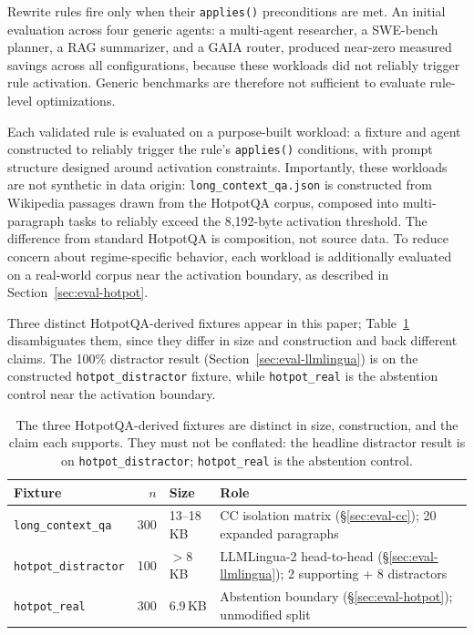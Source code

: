 \documentclass[sigconf,9pt]{acmart}
\begin{document}
Rewrite rules fire only when their \texttt{applies()} preconditions are met. An
initial evaluation across four generic agents: a multi-agent researcher, a
SWE-bench planner, a RAG summarizer, and a GAIA router, produced near-zero
measured savings across all configurations, because these workloads did not reliably
trigger rule activation. Generic benchmarks are therefore not sufficient to evaluate
rule-level optimizations.

Each validated rule is evaluated on a purpose-built workload: a fixture and agent
constructed to reliably trigger the rule's \texttt{applies()} conditions, with prompt
structure designed around activation constraints. Importantly, these workloads are not
synthetic in data origin: \texttt{long\_context\_qa.json} is constructed from
Wikipedia passages drawn from the HotpotQA corpus, composed into multi-paragraph tasks
to reliably exceed the 8,192-byte activation threshold. The difference from standard
HotpotQA is composition, not source data. To reduce concern about regime-specific
behavior, each workload is additionally evaluated on a real-world corpus near the
activation boundary, as described in Section~\ref{sec:eval-hotpot}.

Three distinct HotpotQA-derived fixtures appear in this paper; Table~\ref{tab:fixtures}
disambiguates them, since they differ in size and construction and back different
claims. The 100\% distractor result (Section~\ref{sec:eval-llmlingua}) is on the
constructed \texttt{hotpot\_distractor} fixture, while \texttt{hotpot\_real} is the
abstention control near the activation boundary.

\begin{table}[t]
\caption{The three HotpotQA-derived fixtures are distinct in size, construction, and
the claim each supports. They must not be conflated: the headline distractor result is
on \texttt{hotpot\_distractor}; \texttt{hotpot\_real} is the abstention control.}
\label{tab:fixtures}
\footnotesize
\begin{tabularx}{\columnwidth}{@{} l r l X @{}}
\toprule
Fixture & $n$ & Size & Role \\
\midrule
\texttt{long\_context\_qa}  & 300 & 13--18\,KB & CC isolation matrix (\S\ref{sec:eval-cc}); 20 expanded paragraphs \\
\texttt{hotpot\_distractor} & 100 & $>$8\,KB   & LLMLingua-2 head-to-head (\S\ref{sec:eval-llmlingua}); 2 supporting + 8 distractors \\
\texttt{hotpot\_real}       & 300 & 6.9\,KB    & Abstention boundary (\S\ref{sec:eval-hotpot}); unmodified split \\
\bottomrule
\end{tabularx}
\end{table}
\end{document}
